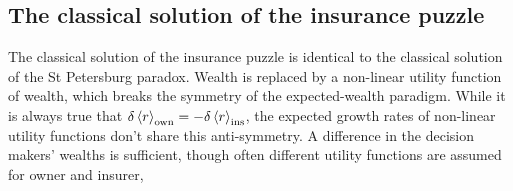 \subsection{The classical solution of the insurance puzzle}

%
%
The classical solution of the insurance puzzle is identical to the classical solution of the St Petersburg paradox.
Wealth is replaced by a non-linear utility function of wealth, which breaks the symmetry of the 
expected-wealth paradigm. While it is always true that $\delta\left\langle r\right\rangle_\text{own}=-\delta\left\langle r\right\rangle_\text{ins}$, 
the expected growth rates of non-linear utility functions don't share this anti-symmetry. A difference in 
the decision makers' wealths is sufficient, though often different utility functions are assumed for owner and insurer, 
